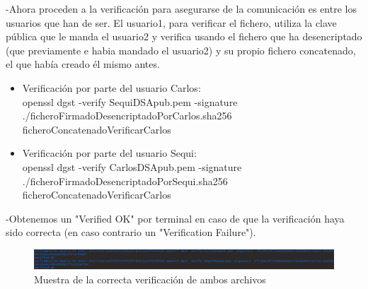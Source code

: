 -Ahora proceden a la verificación para asegurarse de la comunicación es entre los usuarios que han de ser.
El usuario1, para verificar el fichero, utiliza la clave pública que le manda el usuario2 y verifica usando el fichero que ha desencriptado (que previamente e habia mandado el usuario2) y su propio fichero concatenado, el que había creado él mismo antes.

\begin{itemize}
	\item Verificación por parte del usuario Carlos: \\
	
	openssl dgst -verify SequiDSApub.pem -signature ./ficheroFirmadoDesencriptadoPorCarlos.sha256 ficheroConcatenadoVerificarCarlos
	
	\item Verificación por parte del usuario Sequi: \\
	
	openssl dgst -verify CarlosDSApub.pem -signature ./ficheroFirmadoDesencriptadoPorSequi.sha256 ficheroConcatenadoVerificarCarlos
\end{itemize}

-Obtenemos un "Verified OK" por terminal en caso de que la verificación haya sido correcta (en caso contrario un "Verification Failure").

\begin{figure}[h]
	\centering
	\includegraphics[width=1.2\textwidth]{imagenes/verificacion}
	\caption{Muestra de la correcta verificación de ambos archivos}
\end{figure}
















\newpage






